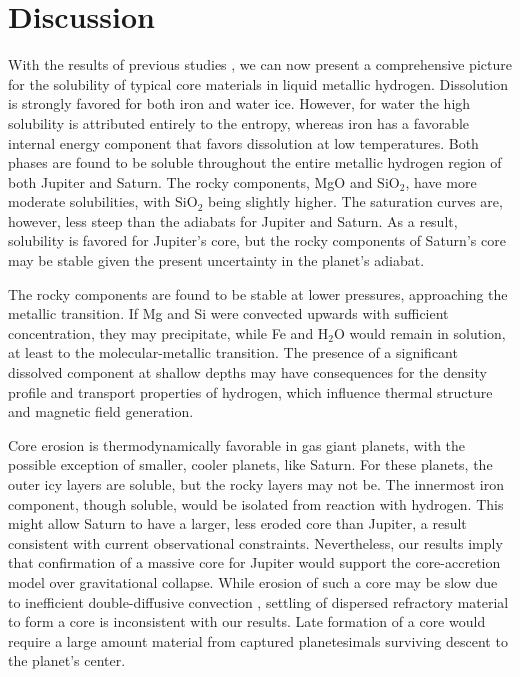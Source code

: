 \section{Discussion}

With the results of previous studies
\citep{wilson12a,wilson12b,gonzalez13}, we can now present a comprehensive
picture for the solubility of typical core materials in liquid
metallic hydrogen.
Dissolution is strongly favored for both iron and water
ice. However, for water the high solubility is attributed entirely to the
entropy, whereas iron has a favorable internal energy component that favors
dissolution at low temperatures.
Both phases are found to be soluble throughout the entire metallic
hydrogen region of both Jupiter and Saturn. The rocky components, MgO and
$\mathrm{SiO}_2$, have more moderate solubilities, with $\mathrm{SiO}_2$ being slightly higher. The saturation
curves are, however, less steep than the adiabats for Jupiter and Saturn. As a
result, solubility is favored for Jupiter's core, but the rocky components of
Saturn's core may be stable given the present uncertainty in the planet's
adiabat.

The rocky components are found to be
stable at lower pressures, approaching the metallic transition. If Mg and Si
were convected upwards with sufficient concentration, they may precipitate, while
Fe and $\mathrm{H}_2\mathrm{O}$ would remain in solution, at least to the molecular-metallic
transition. 
The presence of a significant dissolved component at shallow depths may have
consequences for the density profile and transport properties of
hydrogen, which influence thermal structure and magnetic field
generation.

Core erosion is thermodynamically favorable in gas giant planets,
with the possible exception of smaller, cooler planets, like Saturn. For these planets, the
outer icy layers are soluble, but the rocky layers may not be. The innermost
iron component, though soluble, would be isolated from reaction with hydrogen.
This might allow Saturn to have a larger, less eroded core than
Jupiter, a result consistent with current observational constraints.
Nevertheless, our results imply
that confirmation of a massive core for Jupiter would support the
core-accretion model over gravitational collapse. While erosion of such a core
may be slow due to inefficient double-diffusive convection
\citep{stevenson82a,chabrier07,leconte12,mirouh12}, settling of dispersed
refractory material to form a core is inconsistent with our results. Late formation of a core
would require a large amount material from captured planetesimals
surviving descent to the planet's center.

